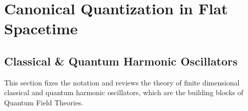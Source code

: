 \documentclass[../QFT_main.tex]{subfiles}
\begin{document}
\chapter{Canonical Quantization in Flat Spacetime}



\section[Classical \& Quantum Harmonic Oscillators]
{Classical \& Quantum Harmonic Oscillators
}
\label{sec:harmonic_oscillators}

This section fixes the notation and reviews the theory of finite dimensional classical and quantum harmonic oscillators, which are the building blocks of Quantum Field Theories.
\end{document}
